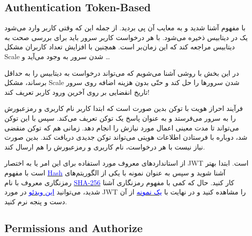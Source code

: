\documentclass[]{article}
\newcommand{\link}[2]{\href{#1}{\textcolor{blue}{#2}}}
\begin{document}
\subsection*{{\titr Authentication Token-Based}}
با مفهوم  آشنا شدید و به معایب آن پی بردید. از جمله این که وقتی کاربر وارد می‌شود یک  در دیتابیس ذخیره می‌شود. با هر درخواست کاربر سرور باید برای بررسی صحت  به دیتابیس مراجعه کند که این زمان‌بر است. همچنین با افزایش تعداد کاربران مشکل Scale شدن سرور به وجود می‌آید و …

در این بخش با روشی آشنا می‌شویم که می‌تواند درخواست به دیتابیس را به حداقل برساند، مشکل Scale شدن سرورها را حل کند و حتّی بدون هزینه اضافه روی سرور تاریخ انقضایی بر روی آخرین ورود کاربر تعریف کند!

فرآیند احراز هویت با توکن بدین صورت است که ابتدا کاربر نام کاربری و رمزعبورش را به سرور می‌فرستد و به عنوان پاسخ یک توکن تعریف می‌کند. سپس با این توکن می‌تواند تا مدت معینی اعمال مورد نیازش را انجام دهد. زمانی هم که توکن منقضی شد، دوباره با فرستادن اطلاعات هویتی می‌تواند توکن جدیدی دریافت کند. بدین صورت نیاز نیست با هر درخواست، نام کاربری و رمزعبورش را هم ارسال کند.

از استانداردهای معروف مورد استفاده برای این امر  یا به اختصار JWT است. ابتدا بهتر است با مفهوم \link{https://vrgl.ir/eAxIC}{Hash} آشنا شوید و سپس به عنوان نمونه با یکی از الگوریتم‌های رمزنگاری معروف با نام \link{https://sha256algorithm.com/}{SHA-256} کار کنید. حال که کمی با مفهوم رمزنگاری آشنا شدید، می‌توانید \link{https://www.youtube.com/watch?v=7Q17ubqLfaM}{این ویدئو} در مورد JWT را مشاهده کنید و در نهایت با \link{https://jwt.io/}{یک نمونه} از آن دست و پنجه نرم کنید.

\subsection*{{\titr Permissions and Authorize}}
\end{document}
